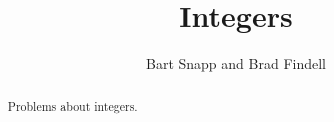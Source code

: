 \documentclass[nooutcomes]{ximera}
\title{Integers}
\author{Bart Snapp and Brad Findell}
\begin{document}
\begin{abstract}
Problems about integers.
\end{abstract}
\maketitle





%
%
\end{document}
